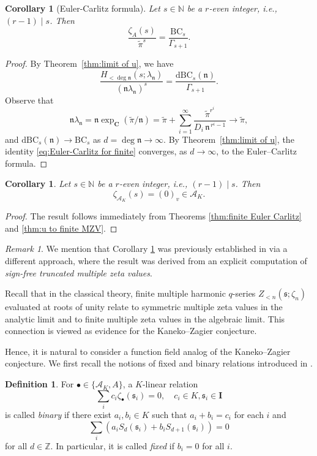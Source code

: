 \documentclass[12pt,reqno]{amsart}
\numberwithin{equation}{section}
\theoremstyle{plain}
\newtheorem{cor}[thm]{Corollary}
\theoremstyle{definition}
\newtheorem{df}[thm]{Definition}
\theoremstyle{remark}
\newtheorem{rmk}[thm]{Remark}
\newcommand{\ZZ}{\mathbb{Z}}
\newcommand{\NN}{\mathbb{N}}
\newcommand{\nfk}{\mathfrak{n}}
\newcommand{\Acal}{\mathcal{A}}
\newcommand{\cpi}{\tilde{\pi}}
\newcommand{\ww}[1]{\mathfrak{#1}}
\newcommand{\BC}{\mathrm{BC}}
\newcommand{\dBC}{\mathrm{dBC}}
\newcommand{\bfC}{\mathbf{C}}
\newcommand{\Ical}{\mathbf{I}}
\begin{document}
\begin{cor}[Euler-Carlitz formula]\label{cor:Euler-Carlitz}
    Let $s\in\NN$ be a $r$-even integer, i.e., $(r-1)\mid s$. Then 
    $$\frac{\zeta_A(s)}{\cpi^{s}}=\frac{\BC_s}{\Gamma_{s+1}}.$$
\end{cor}
\begin{proof}
    By Theorem~\ref{thm:limit of u}, we have
    \begin{equation}\label{eq:Euler-Carlitz for finite}
        \frac{H_{<\deg\nfk}(s;\lambda_\nfk)}{(\nfk\lambda_\nfk)^s}=\frac{\dBC_s(\nfk)}{\Gamma_{s+1}}.
    \end{equation}
    Observe that
    \[
        \nfk\lambda_\nfk
        =
        \nfk \exp_\bfC(\cpi/\nfk)
        =
        \cpi
        +
        \sum_{i=1}^{\infty}\frac{\cpi^{r^i}}{D_i\,\nfk^{\,r^i-1}}
        \to \cpi,
    \]
     and $\dBC_s(\nfk)\to\BC_s$ as $d=\deg\nfk\to\infty$. By Theorem~\ref{thm:limit of u}, the identity \eqref{eq:Euler-Carlitz for finite} converges, as $d\to\infty$, to the Euler--Carlitz formula.
\end{proof}

\begin{cor}\label{cor:vanishing of fmzv qeven}
    Let $s\in\NN$ be a $r$-even integer, i.e., $(r-1)\mid s$. Then 
    $$\zeta_{\Acal_K}(s)=(0)_v\in\Acal_K.$$
\end{cor}
\begin{proof}
    The result follows immediately from Theorems \ref{thm:finite Euler Carlitz} and \ref{thm:u to finite MZV}.
\end{proof}
\begin{rmk}
    We mention that Corollary \ref{cor:vanishing of fmzv qeven} was previously established in \cite{Shi2018} via a different approach, where the result was derived from an explicit computation of \textit{sign-free truncated multiple zeta values}.
\end{rmk}
Recall that in the classical theory, finite multiple harmonic $q$-series $Z_{<n}(\ww{s};\zeta_n)$ evaluated at roots of unity relate to symmetric multiple zeta values in the analytic limit and to finite multiple zeta values in the algebraic limit. This connection is viewed as evidence for the Kaneko--Zagier conjecture. 

Hence, it is natural to consider a function field analog of the Kaneko--Zagier conjecture.  
We first recall the notions of fixed and binary relations introduced in \cite{Todd2018}. 

\begin{df}
    For $\bullet\in\{\Acal_K,A\}$, a $K$-linear relation 
    \[ \sum_{i}c_i\zeta_{\bullet}(\ww{s}_i)=0,\quad c_i\in K, \ww{s}_i\in\Ical \]
    is called \textit{binary} if there exist $a_i,b_i\in K$ such that $a_i+b_i=c_i$ for each $i$ and 
    \[ \sum_{i} (a_i S_d(\ww{s}_i) + b_i S_{d+1}(\ww{s}_i)) = 0 \]
    for all $d\in\ZZ$. In particular, it is called \textit{fixed} if $b_i=0$ for all $i$.
\end{df}
\end{document}
